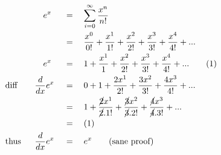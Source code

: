 \begin{alignat*}{5}
&\,&&\quad e^x&&\,=\quad\sum_{i=0}^\infty\frac{x^n}{n!}\\
&\,&&\,&&\,=\quad\frac{x^0}{0!}+\frac{x^1}{1!}+\frac{x^2}{2!}+\frac{x^3}{3!}+\frac{x^4}{4!}+...\\
&\,&&\quad e^x&&\,=\quad1+\frac{x^1}{1}+\frac{x^2}{2!}+\frac{x^3}{3!}+\frac{x^4}{4!}+...\quad&&(1)\\
&\mathrm{diff}\quad&&\frac{d}{dx}e^x&&\,=\quad0+1+\frac{2x^1}{2!}+\frac{3x^2}{3!}+\frac{4x^3}{4!}+...\\
&\,&&\,&&\,=\quad1+\frac{\cancel{2}x^1}{\cancel{2}.1!}+\frac{\cancel{3}x^2}{\cancel{3}.2!}+\frac{\cancel{4}x^3}{\cancel{4}.3!}+...\\
&\,&&\,&&\,=\quad(1)\\
&\mathrm{thus}&&\frac{d}{dx}e^x&&\,=\quad e^x\qquad\mathrm{(sane~proof)}
\end{alignat*}
